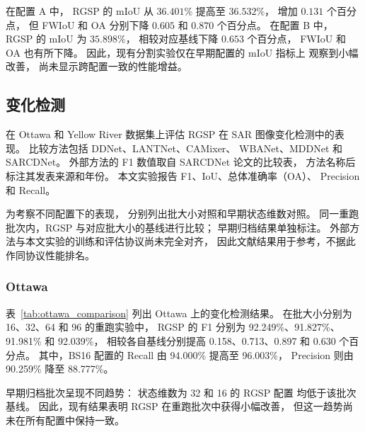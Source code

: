 \documentclass[journal]{IEEEtran}
\begin{document}
在配置 A 中，
RGSP 的 mIoU 从 $36.401\%$ 提高至 $36.532\%$，
增加 $0.131$ 个百分点，
但 FWIoU 和 OA 分别下降
$0.605$ 和 $0.870$ 个百分点。
在配置 B 中，
RGSP 的 mIoU 为 $35.898\%$，
相较对应基线下降 $0.653$ 个百分点，
FWIoU 和 OA 也有所下降。
因此，现有分割实验仅在早期配置的 mIoU 指标上
观察到小幅改善，
尚未显示跨配置一致的性能增益。
\subsection{变化检测}
\label{sec:change_detection_results}

在 Ottawa 和 Yellow River 数据集上评估 RGSP
在 SAR 图像变化检测中的表现。
比较方法包括 DDNet、LANTNet、CAMixer、
WBANet、MDDNet 和 SARCDNet。
外部方法的 F1 数值取自 SARCDNet 论文的比较表，
方法名称后标注其发表来源和年份。
本文实验报告 F1、IoU、总体准确率（OA）、
Precision 和 Recall。

为考察不同配置下的表现，
分别列出批大小对照和早期状态维数对照。
同一重跑批次内，RGSP 与对应批大小的基线进行比较；
早期归档结果单独标注。
外部方法与本文实验的训练和评估协议尚未完全对齐，
因此文献结果用于参考，不据此作同协议性能排名。

\subsubsection{Ottawa}
\label{sec:ottawa_results}

表~\ref{tab:ottawa_comparison}
列出 Ottawa 上的变化检测结果。
在批大小分别为 16、32、64 和 96 的重跑实验中，
RGSP 的 F1 分别为
92.249\%、91.827\%、91.981\% 和 92.039\%，
相较各自基线分别提高
0.158、0.713、0.897 和 0.630 个百分点。
其中，BS16 配置的 Recall
由 94.000\% 提高至 96.003\%，
Precision 则由 90.259\% 降至 88.777\%。

早期归档批次呈现不同趋势：
状态维数为 32 和 16 的 RGSP 配置
均低于该批次基线。
因此，现有结果表明 RGSP 在重跑批次中获得小幅改善，
但这一趋势尚未在所有配置中保持一致。
\end{document}
